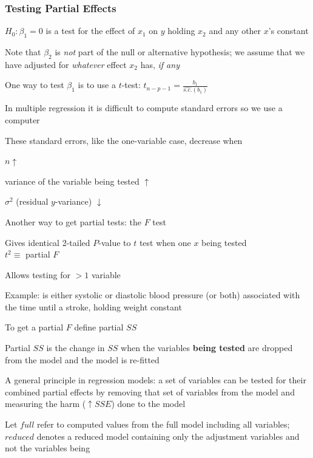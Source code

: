 \subsubsection{Testing Partial Effects}
\bi
\item $H_{0}: \beta_{1}=0$ is a test for the effect of $x_{1}$ on $y$
  holding $x_{2}$ and any other $x$'s constant
\item Note that $\beta_{2}$ is \emph{not} part of the null or
  alternative hypothesis; we assume that we have adjusted for
  \emph{whatever} effect $x_{2}$ has, \emph{if any}
\item One way to test $\beta_{1}$ is to use a $t$-test:
  $t_{n-p-1} = \frac{b_{1}}{\widehat{s.e.}(b_{1})}$
\item In multiple regression it is difficult to compute standard
  errors so we use a computer
\item These standard errors, like the one-variable case, decrease when
 \bi
 \item $n \uparrow$
 \item variance of the variable being tested $\uparrow$
 \item $\sigma^{2}$ (residual $y$-variance) $\downarrow$
 \ei
\item Another way to get partial tests: the $F$ test \ipacue
 \bi
 \item Gives identical 2-tailed $P$-value to $t$ test when one $x$
   being tested \\ $t^{2} \equiv$ partial $F$
 \item Allows testing for $> 1$ variable
 \item Example: is either systolic or diastolic blood pressure (or
   both) associated with the time until a stroke, holding weight constant
 \ei
\item To get a partial $F$ define partial $SS$
\item Partial $SS$ is the change in $SS$ when the variables
  \textbf{being tested} are dropped from the model and the model is
  re-fitted
\item A general principle in regression models: a set of variables can
  \ipacue
  be tested for their combined partial effects by removing that set of
  variables from the model and measuring the harm ($\uparrow SSE$)
  done to the model
\item Let $full$ refer to computed values from the full model
  including all variables; $reduced$ denotes a reduced model
  containing only the adjustment variables and not the variables being
